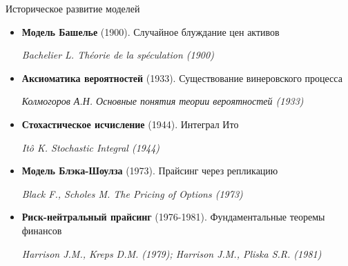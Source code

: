 \documentclass{beamer}
\begin{document}
\begin{frame}{Историческое развитие моделей}
\footnotesize
\begin{itemize}
\item \textbf{Модель Башелье} (1900). Случайное блуждание цен активов \\ 
\begin{scriptsize}{\textit{Bachelier L. Théorie de la spéculation (1900)}}\end{scriptsize}

\item \textbf{Аксиоматика вероятностей} (1933). Существование винеровского процесса \\
\begin{scriptsize}{\textit{Колмогоров А.Н. Основные понятия теории вероятностей (1933)}}\end{scriptsize}

\item \textbf{Стохастическое исчисление} (1944). Интеграл Ито \\
\begin{scriptsize}{\textit{Itô K. Stochastic Integral (1944)}}\end{scriptsize}

\item \textbf{Модель Блэка-Шоулза} (1973). Прайсинг через репликацию \\
\begin{scriptsize}{\textit{Black F., Scholes M. The Pricing of Options (1973)}}\end{scriptsize}

\item \textbf{Риск-нейтральный прайсинг} (1976-1981). Фундаментальные теоремы финансов\\
\begin{scriptsize}{\textit{Harrison J.M., Kreps D.M. (1979); Harrison J.M., Pliska S.R. (1981)}}\end{scriptsize}
\end{itemize}
\end{frame}
\end{document}
